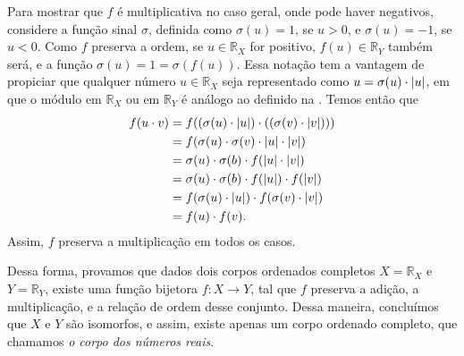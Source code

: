 \documentclass[../main.tex]{subfiles}
\begin{document}
\begin{dem}
\begin{enumerate}
\begin{enumerate}
            Para mostrar que $f$ é multiplicativa no caso geral, onde pode haver negativos, considere a função sinal $\sigma$, definida como $\sigma(u) = 1$, se $u > 0$, e $\sigma(u) = -1$, se $u < 0$. Como $f$ preserva a ordem, se $u \in \mathbb{R}_X$ for positivo, $f(u) \in \mathbb{R}_Y$ também será, e a função $\sigma(u)=1=\sigma( f(u) )$. Essa notação tem a vantagem de propiciar que qualquer número $u \in \mathbb{R}_X$ seja representado como $u = \sigma(u) \cdot \abs{u}$, em que o módulo em $\mathbb{R}_X$ ou em $\mathbb{R}_Y$ é análogo ao definido na . Temos então que
            \begin{align*}
                f(u \cdot v) &= f((\sigma(u) \cdot \abs{u}) \cdot ((\sigma(v) \cdot \abs{v}))) \\
                &= f(\sigma(u) \cdot \sigma(v) \cdot \abs{u}\cdot \abs{v}) \\
                &= \sigma(u) \cdot \sigma(b) \cdot f(\abs{u} \cdot \abs{v}) \\
                &= \sigma(u) \cdot \sigma(b) \cdot f(\abs{u}) \cdot f(\abs{v}) \\
                &= f(\sigma(u) \cdot \abs{u}) \cdot f(\sigma(v) \cdot \abs{v}) \\
                &= f(u) \cdot f(v).
            \end{align*}
            Assim, $f$ preserva a multiplicação em todos os casos.
        \end{enumerate}
        Dessa forma, provamos que dados dois corpos ordenados completos $X = \mathbb{R}_X$ e $Y = \mathbb{R}_Y$, existe uma função bijetora $f \colon X \to Y$, tal que $f$ preserva a adição, a multiplicação, e a relação de ordem desse conjunto. Dessa maneira, concluímos que $X$ e $Y$ são isomorfos, e assim, existe apenas um corpo ordenado completo, que chamamos \emph{o corpo dos números reais}.
    
\end{enumerate}
    
\end{dem}
\end{document}
